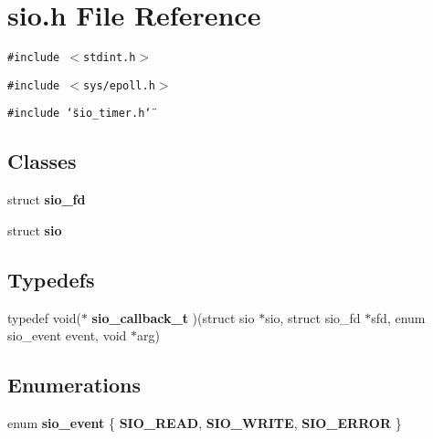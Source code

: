 \section{sio.h File Reference}
\label{sio_8h}
{\tt \#include $<$stdint.h$>$}\par
{\tt \#include $<$sys/epoll.h$>$}\par
{\tt \#include \char`\"{}sio\_\-timer.h\char`\"{}}\par
\subsection*{Classes}
\begin{CompactItemize}
\item 
struct {\bf sio\_\-fd}
\item 
struct {\bf sio}
\end{CompactItemize}
\subsection*{Typedefs}
\begin{CompactItemize}
\item 
typedef void($\ast$ {\bf sio\_\-callback\_\-t} )(struct sio $\ast$sio, struct sio\_\-fd $\ast$sfd, enum sio\_\-event event, void $\ast$arg)\label{sio_8h_a0}

\end{CompactItemize}
\subsection*{Enumerations}
\begin{CompactItemize}
\item 
enum {\bf sio\_\-event} \{ {\bf SIO\_\-READ}, 
{\bf SIO\_\-WRITE}, 
{\bf SIO\_\-ERROR}
 \}
\end{CompactItemize}

